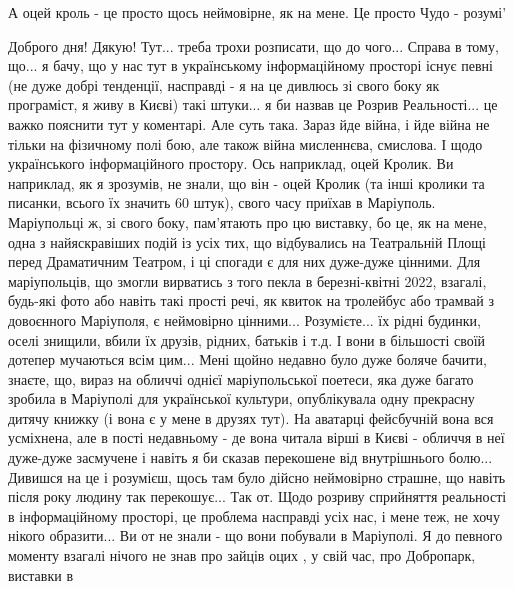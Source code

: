  
 
 
 
 

А оцей кроль - це просто щось неймовірне, як на мене. Це просто Чудо - розумі'

Доброго дня! Дякую! Тут... треба трохи розписати, що до чого... Справа в тому,
що... я бачу, що у нас тут в українському інформаційному просторі існує певні
(не дуже добрі тенденції, насправді - я на це дивлюсь зі свого боку як
програміст, я живу в Києві) такі штуки... я би назвав це Розрив Реальності...
це важко пояснити тут у коментарі. Але суть така. Зараз йде війна, і йде війна
не тільки на фізичному полі бою, але також війна мисленнєва, смислова. І щодо
українського інформаційного простору. Ось наприклад, оцей Кролик. Ви наприклад,
як я зрозумів, не знали, що він - оцей Кролик (та інші кролики та писанки,
всього їх значить 60 штук), свого часу приїхав в Маріуполь. Маріупольці ж, зі
свого боку, пам'ятають про цю виставку, бо це, як на мене, одна з найяскравіших
подій із усіх тих, що відбувались на Театральній Площі перед Драматичним
Театром, і ці спогади є для них дуже-дуже цінними. Для маріупольців, що змогли
вирватись з того пекла в березні-квітні 2022, взагалі, будь-які фото або навіть
такі прості речі, як квиток на тролейбус або трамвай з довоєнного Маріуполя, є
неймовірно цінними... Розумієте... їх рідні будинки, оселі знищили, вбили їх
друзів, рідних, батьків і т.д. І вони в більшості своїй дотепер мучаються всім
цим... Мені щойно недавно було дуже боляче бачити, знаєте, що, вираз на обличчі
однієї маріупольської поетеси, яка дуже багато зробила в Маріуполі для
української культури, опублікувала одну прекрасну дитячу книжку (і вона є у
мене в друзях тут). На аватарці фейсбучній вона вся усміхнена, але в пості
недавньому - де вона читала вірші в Києві - обличчя в неї дуже-дуже засмучене і
навіть я би сказав перекошене від внутрішнього болю... Дивишся на це і
розумієш, щось там було дійсно неймовірно страшне, що навіть після року людину
так перекошує... Так от. Щодо розриву сприйняття реальності в інформаційному
просторі, це проблема насправді усіх нас, і мене теж, не хочу нікого
образити... Ви от не знали - що вони побували в Маріуполі. Я до певного моменту
взагалі нічого не знав про зайців оцих , у свій час, про Добропарк, виставки в
